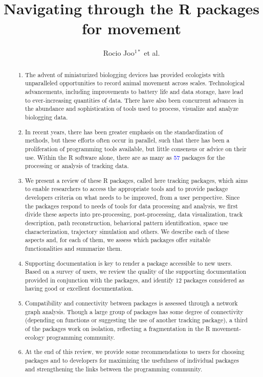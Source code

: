 \documentclass[a4paper,12pt]{article}
\title{Navigating through the R packages for movement}
\author{Rocio Joo$^{1*}$ et al.}
\begin{document}
\maketitle


\begin{abstract}                %
  \noindent \begin{enumerate}
  \item The advent of miniaturized biologging devices has provided ecologists with unparalleled opportunities to record animal movement across scales. Technological advancements, including improvements to battery life and data storage, have lead to ever-increasing quantities of data. There have also been concurrent advances in the abundance and sophistication of tools used to process, visualize and analyze biologging data.   
  \item In recent years, there has been greater emphasis on the standardization of methods, but these efforts often occur in parallel, such that there has been a proliferation of programming tools available, but little consensus or advice on their use. Within the R software alone, there are as many as \textcolor{blue}{57} packages for the processing or analysis of tracking data. 
  \item We present a review of these R packages, called here tracking packages, which aims to enable researchers to access the appropriate tools and to provide package developers criteria on what needs to be improved, from a user perspective. Since the packages respond to needs of tools for data processing and analysis, we first divide these aspects into pre-processing, post-processing, data visualization, track description, path reconstruction, behavioral pattern identification, space use characterization, trajectory simulation and others. We describe each of these aspects and, for each of them, we assess which packages offer suitable functionalities and summarize them. 
  \item Supporting documentation is key to render a package accessible to new users. Based on a survey of users, we review the quality of the supporting documentation provided in conjunction with the packages, and identify $12$ packages considered as having good or excellent documentation. 
  \item Compatibility and connectivity between packages is assessed through a network graph analysis. Though a large group of packages has some degree of connectivity (depending on functions or suggesting the use of another tracking package), a third of the packages work on isolation, reflecting a fragmentation in the R movement-ecology programming community. 
  \item At the end of this review, we provide some recommendations to users for choosing packages and to developers for maximizing the usefulness of individual packages and strengthening the links between the programming community. 
  \end{enumerate}
\end{abstract}
\end{document}
